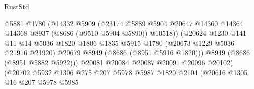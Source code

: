 \begin{lexlean}{RustStd}
\begin{coremodule}
                                          @5881
                                          @1780
                                          (@14332
                                            @5909
                                            (@23174
                                              @5889
                                              @5904
                                              @20647
                                              @14360
                                              @14364
                                              @14368
                                              @8937
                                              (@8686 (@9510 @5904 @5890))
                                              @10518))
                                          (@20624
                                            @1230
                                            @141
                                            @11
                                            @14
                                            @5036
                                            @1820
                                            @1806
                                            @1835
                                            @5915
                                            @1780
                                            (@20673 @1229 @5036 @21916 @21920)
                                            @20679
                                            @8949
                                            (@8686 (@8951 @5916 @1820)))
                                          @8949
                                          (@8686 (@8951 @5882 @5922)))
                                        @20081
                                        @20084
                                        @20087
                                        @20091
                                        @20096
                                        @20102)
                                      (@20702
                                        @5932
                                        @1306
                                        @275
                                        @207
                                        @5978
                                        @5987
                                        @1820
                                        @2104
                                        (@20616
                                          @1305
                                          @16
                                          @207
                                          @5978
                                          @5985

\end{coremodule}
\end{lexlean}

